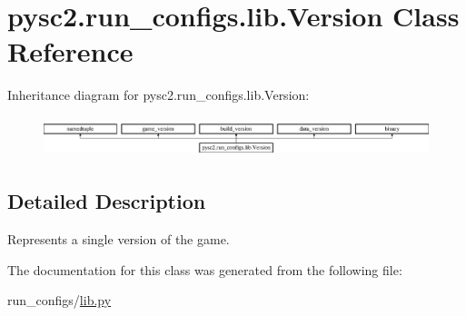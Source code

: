 \hypertarget{classpysc2_1_1run__configs_1_1lib_1_1_version}{}\section{pysc2.\+run\+\_\+configs.\+lib.\+Version Class Reference}
\label{classpysc2_1_1run__configs_1_1lib_1_1_version}
Inheritance diagram for pysc2.\+run\+\_\+configs.\+lib.\+Version\+:\begin{figure}[H]
\begin{center}
\leavevmode
\includegraphics[height=1.178947cm]{classpysc2_1_1run__configs_1_1lib_1_1_version}
\end{center}
\end{figure}


\subsection{Detailed Description}
\begin{DoxyVerb}Represents a single version of the game.\end{DoxyVerb}
 

The documentation for this class was generated from the following file\+:\begin{DoxyCompactItemize}
\item 
run\+\_\+configs/\mbox{\hyperlink{run__configs_2lib_8py}{lib.\+py}}\end{DoxyCompactItemize}
